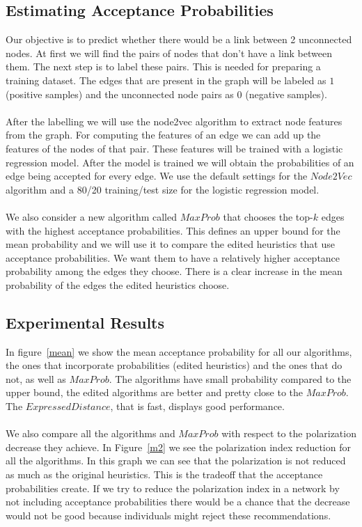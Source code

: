 \subsection{Estimating Acceptance Probabilities}
\vspace{15pt}		
Our objective is to predict whether there would be a link between 2 unconnected nodes. At first we will find the pairs of nodes that don't have a link between them.	
The next step is to label these pairs. This is needed for preparing a training dataset. 
The edges that are present in the graph will be labeled as $1$ (positive samples) and the unconnected node pairs as $0$ (negative samples).		
\\
\\
\noindent After the labelling we will use the node2vec algorithm to extract node features from the graph. For computing the features of an edge we can add up the features of the nodes of that pair. These features will be trained with a logistic regression model. After the model is trained we will obtain the probabilities of an edge being accepted for every edge. We use the default settings for the $Node2Vec$ algorithm and a 80/20 training/test size for the logistic regression model.
\\
\\
We also consider a new algorithm called $MaxProb$ that chooses the top-$k$ edges with the highest acceptance probabilities. This defines an upper bound for the mean probability and we will use it to compare the edited heuristics that use acceptance probabilities. We want them to have a relatively higher acceptance probability among the edges they choose. There is a clear increase in the mean probability of the edges the edited heuristics choose.
 \clearpage
 
\subsection{Experimental Results}
\vspace{15pt}
In figure~\ref{mean} we show the mean acceptance probability for all our algorithms, the ones that incorporate probabilities (edited heuristics) and the ones that do not, as well as $MaxProb$. The algorithms have small probability compared to the upper bound, the edited algorithms are better and pretty close to the $MaxProb$. The $ExpressedDistance$, that is fast, displays good performance.
\\
\\
\noindent We also compare all the algorithms and $MaxProb$ with respect to the polarization decrease they achieve. In Figure~\ref{m2} we see the polarization index reduction for all the algorithms. In this graph we can see that the polarization is not reduced as much as the original heuristics. This is the tradeoff that the acceptance probabilities create. If we try to reduce the polarization index in a network by not including acceptance probabilities there would be a chance that the decrease would not be good because individuals might reject these recommendations. 


